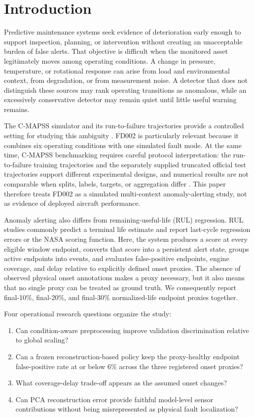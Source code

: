 \documentclass[11pt]{article}
\begin{document}
\section{Introduction}


Predictive maintenance systems seek evidence of deterioration early enough to support inspection, planning, or intervention without creating an unacceptable burden of false alerts. That objective is difficult when the monitored asset legitimately moves among operating conditions. A change in pressure, temperature, or rotational response can arise from load and environmental context, from degradation, or from measurement noise. A detector that does not distinguish these sources may rank operating transitions as anomalous, while an excessively conservative detector may remain quiet until little useful warning remains.


The C-MAPSS simulator and its run-to-failure trajectories provide a controlled setting for studying this ambiguity \citep{core001}. FD002 is particularly relevant because it combines six operating conditions with one simulated fault mode. At the same time, C-MAPSS benchmarking requires careful protocol interpretation: the run-to-failure training trajectories and the separately supplied truncated official test trajectories support different experimental designs, and numerical results are not comparable when splits, labels, targets, or aggregation differ \citep{core003,core004}. This paper therefore treats FD002 as a simulated multi-context anomaly-alerting study, not as evidence of deployed aircraft performance.


Anomaly alerting also differs from remaining-useful-life (RUL) regression. RUL studies commonly predict a terminal life estimate and report last-cycle regression errors or the NASA scoring function. Here, the system produces a score at every eligible window endpoint, converts that score into a persistent alert state, groups active endpoints into events, and evaluates false-positive endpoints, engine coverage, and delay relative to explicitly defined onset proxies. The absence of observed physical onset annotations makes a proxy necessary, but it also means that no single proxy can be treated as ground truth. We consequently report final-10\%, final-20\%, and final-30\% normalized-life endpoint proxies together.


Four operational research questions organize the study:


\begin{enumerate}
\item Can condition-aware preprocessing improve validation discrimination relative to global scaling?
\item Can a frozen reconstruction-based policy keep the proxy-healthy endpoint false-positive rate at or below 6\% across the three registered onset proxies?
\item What coverage-delay trade-off appears as the assumed onset changes?
\item Can PCA reconstruction error provide faithful model-level sensor contributions without being misrepresented as physical fault localization?
\end{enumerate}
\end{document}
